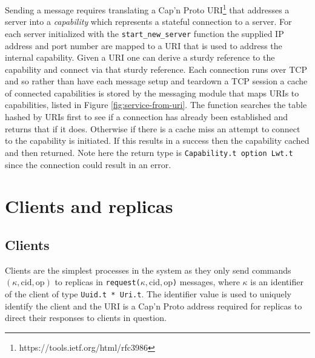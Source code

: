 {\color{red}Sending a message requires translating a Cap'n Proto URI\footnote{https://tools.ietf.org/html/rfc3986} that addresses a server into a \emph{capability} which represents a stateful connection to a server. For each server initialized with the \texttt{start\_new\_server} function the supplied IP address and port number are mapped to a URI that is used to address the internal capability. Given a URI one can derive a sturdy reference to the capability and connect via that sturdy reference. Each connection runs over TCP and so rather than have each message setup and teardown a TCP session a cache of connected capabilities is stored by the messaging module that maps URIs to capabilities, listed in Figure \ref{fig:service-from-uri}. The function searches the table hashed by URIs first to see if a connection has already been established and returns that if it does. Otherwise if there is a cache miss an attempt to connect to the capability is initiated. If this results in a success then the capability cached and then returned. Note here the return type is \texttt{Capability.t option Lwt.t} since the connection could result in an error.}





\section{Clients and replicas}

\subsection{Clients}

Clients are the simplest processes in the system as they only send commands $\left(\kappa, \textrm{cid}, \textrm{op} \right)$ to replicas in \texttt{request($\kappa, \textrm{cid}, \textrm{op}$)} messages, where $\kappa$ is an identifier of the client of type \texttt{Uuid.t * Uri.t}. The identifier value is used to uniquely identify the client and the URI is a Cap'n Proto address required for replicas to direct their responses to clients in question. \\

